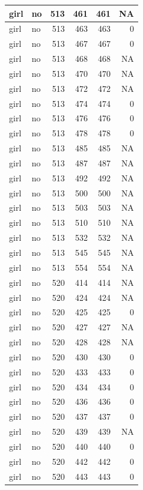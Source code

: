 \documentclass[man]{apa6}
\begin{document}
\begin{tabular}{l|l|r|r|r|r}
\hline
girl & no & 513 & 461 & 461 & NA\\
\hline
girl & no & 513 & 463 & 463 & 0\\
\hline
girl & no & 513 & 467 & 467 & 0\\
\hline
girl & no & 513 & 468 & 468 & NA\\
\hline
girl & no & 513 & 470 & 470 & NA\\
\hline
girl & no & 513 & 472 & 472 & NA\\
\hline
girl & no & 513 & 474 & 474 & 0\\
\hline
girl & no & 513 & 476 & 476 & 0\\
\hline
girl & no & 513 & 478 & 478 & 0\\
\hline
girl & no & 513 & 485 & 485 & NA\\
\hline
girl & no & 513 & 487 & 487 & NA\\
\hline
girl & no & 513 & 492 & 492 & NA\\
\hline
girl & no & 513 & 500 & 500 & NA\\
\hline
girl & no & 513 & 503 & 503 & NA\\
\hline
girl & no & 513 & 510 & 510 & NA\\
\hline
girl & no & 513 & 532 & 532 & NA\\
\hline
girl & no & 513 & 545 & 545 & NA\\
\hline
girl & no & 513 & 554 & 554 & NA\\
\hline
girl & no & 520 & 414 & 414 & NA\\
\hline
girl & no & 520 & 424 & 424 & NA\\
\hline
girl & no & 520 & 425 & 425 & 0\\
\hline
girl & no & 520 & 427 & 427 & NA\\
\hline
girl & no & 520 & 428 & 428 & NA\\
\hline
girl & no & 520 & 430 & 430 & 0\\
\hline
girl & no & 520 & 433 & 433 & 0\\
\hline
girl & no & 520 & 434 & 434 & 0\\
\hline
girl & no & 520 & 436 & 436 & 0\\
\hline
girl & no & 520 & 437 & 437 & 0\\
\hline
girl & no & 520 & 439 & 439 & NA\\
\hline
girl & no & 520 & 440 & 440 & 0\\
\hline
girl & no & 520 & 442 & 442 & 0\\
\hline
girl & no & 520 & 443 & 443 & 0\\

\end{tabular}
\end{document}
